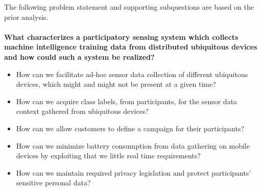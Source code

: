 
The following problem statement and supporting subquestions are based on the prior analysis.
\\\\
\textbf{What characterizes a participatory sensing system which collects machine intelligence training data from distributed ubiquitous devices and how could such a system be realized?}

\begin{itemize}
    \item How can we facilitate ad-hoc sensor data collection of different ubiquitous devices, which might and might not be present at a given time?
    \item How can we acquire class labels, from participants, for the sensor data context gathered from ubiquitous devices?  
    \item How can we allow customers to define a campaign for their participants?
    \item How can we minimize battery consumption from data gathering on mobile devices by exploiting that we little real time requirements?
    \item How can we maintain required privacy legislation and protect participants' sensitive personal data? 
\end{itemize}

